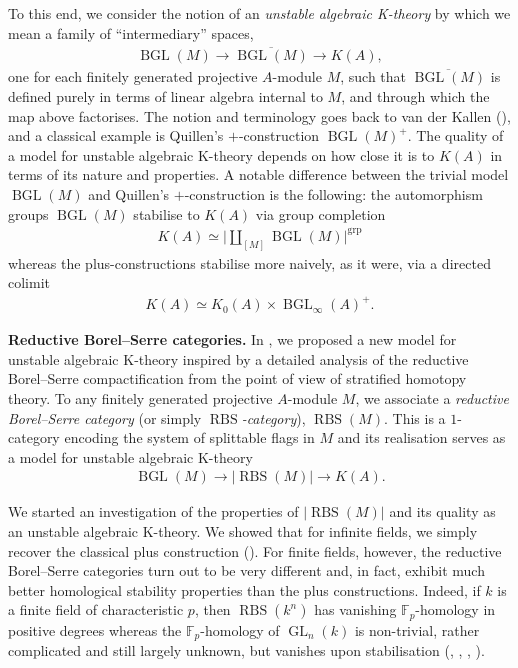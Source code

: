 \documentclass[12pt, reqno]{amsart}
\theoremstyle{plain}
\theoremstyle{definition}
\newcommand{\F}{\mathbb F}
\begin{document}
To this end, we consider the notion of an \textit{unstable algebraic K-theory} by which we mean a family of ``intermediary'' spaces,
\begin{align*}
\operatorname{BGL}(M)\rightarrow \overline{\operatorname{BGL}(M)}\rightarrow K(A),
\end{align*}
one for each finitely generated projective $A$-module $M$, such that $\overline{\operatorname{BGL}(M)}$ is defined purely in terms of linear algebra internal to $M$, and through which the map above factorises. The notion and terminology goes back to van der Kallen (\cite{vanderKallen}), and a classical example is Quillen's $+$-construction $\operatorname{BGL}(M)^+$. The quality of a model for unstable algebraic K-theory depends on how close it is to $K(A)$ in terms of its nature and properties. A notable difference between the trivial model $\operatorname{BGL}(M)$ and Quillen's $+$-construction is the following: the automorphism groups $\operatorname{BGL}(M)$ stabilise to $K(A)$ via group completion
\begin{align*}
K(A)\simeq \bigg| \coprod_{[M]} \operatorname{BGL}(M)\bigg|^{\operatorname{grp}}
\end{align*}
whereas the plus-constructions stabilise more naively, as it were, via a directed colimit
\begin{align*}
K(A)\simeq K_0(A)\times \operatorname{BGL}_\infty(A)^+.
\end{align*}

\textbf{Reductive Borel--Serre categories.} In \cite{ClausenOrsnesJansen}, we proposed a new model for unstable algebraic K-theory inspired by a detailed analysis of the reductive Borel--Serre compactification from the point of view of stratified homotopy theory. To any finitely generated projective $A$-module $M$, we associate a \textit{reductive Borel--Serre category} (or simply \textit{$\operatorname{RBS}$-category}), $\operatorname{RBS}(M)$. This is a $1$-category encoding the system of splittable flags in $M$ and its realisation serves as a model for unstable algebraic K-theory
\begin{align*}
\operatorname{BGL}(M)\rightarrow |\operatorname{RBS}(M)| \rightarrow K(A).
\end{align*}

We started an investigation of the properties of $|\operatorname{RBS}(M)|$ and its quality as an unstable algebraic K-theory. We showed that for infinite fields, we simply recover the classical plus construction (\cite[Theorem 5.15]{ClausenOrsnesJansen}). For finite fields, however, the reductive Borel--Serre categories turn out to be very different and, in fact, exhibit much better homological stability properties than the plus constructions. Indeed, if $k$ is a finite field of characteristic $p$, then $\operatorname{RBS}(k^n)$ has vanishing $\F_p$-homology in positive degrees whereas the $\F_p$-homology of $\operatorname{GL}_n(k)$ is non-trivial, rather complicated and still largely unknown, but vanishes upon stabilisation (\cite[Theorem 5.18]{ClausenOrsnesJansen}, \cite{MilgramPriddy}, \cite{LahtinenSprehn}, \cite{Quillen72}).
\end{document}
